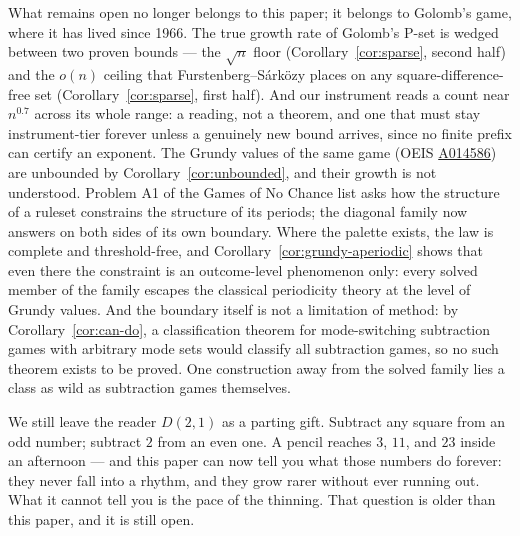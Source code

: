 What remains open no longer belongs to this paper; it belongs to
Golomb's game, where it has lived since 1966. The true growth rate of
Golomb's P-set is wedged between two proven bounds --- the $\sqrt{n}$
floor (Corollary~\ref{cor:sparse}, second half) and the $o(n)$ ceiling
that Furstenberg--S\'ark\"ozy places on any square-difference-free set
(Corollary~\ref{cor:sparse}, first half). And our instrument reads a
count near $n^{0.7}$ across its whole range: a reading, not a theorem,
and one that must stay instrument-tier forever unless a genuinely new
bound arrives, since no finite prefix can certify an exponent. The
Grundy values of the same game (OEIS
\href{https://oeis.org/A014586}{A014586}) are unbounded by
Corollary~\ref{cor:unbounded}, and their growth is not understood.
Problem A1 of the Games of No Chance list \cite{gonc6} asks how the
structure of a ruleset constrains the structure of its periods; the
diagonal family now answers on both sides of its own boundary. Where the
palette exists, the law is complete and threshold-free, and
Corollary~\ref{cor:grundy-aperiodic} shows that even there the constraint
is an outcome-level phenomenon only: every solved member of the family
escapes the classical periodicity theory at the level of Grundy values.
And the boundary itself is not a limitation of method: by
Corollary~\ref{cor:can-do}, a classification theorem for mode-switching
subtraction games with arbitrary mode sets would classify all subtraction
games, so no such theorem exists to be proved. One construction away from
the solved family lies a class as wild as subtraction games
themselves.

We still leave the reader $D(2,1)$ as a parting gift. Subtract any
square from an odd number; subtract $2$ from an even one. A pencil
reaches $3$, $11$, and $23$ inside an afternoon --- and this paper can
now tell you what those numbers do forever: they never fall into a
rhythm, and they grow rarer without ever running out. What it cannot
tell you is the pace of the thinning. That question is older than this
paper, and it is still open.


